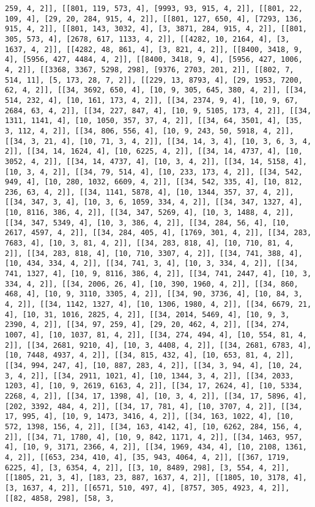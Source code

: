 \documentclass[12pt,fleqn]{article}\usepackage{../../common}
\begin{document}
\begin{verbatim}
259, 4, 2]], [[801, 119, 573, 4], [9993, 93, 915, 4, 2]], [[801, 22, 109, 4], [29, 20, 284, 915, 4, 2]], [[801, 127, 650, 4], [7293, 136, 915, 4, 2]], [[801, 143, 3032, 4], [3, 3871, 284, 915, 4, 2]], [[801, 305, 573, 4], [2678, 617, 1133, 4, 2]], [[4282, 10, 2164, 4], [3, 1637, 4, 2]], [[4282, 48, 861, 4], [3, 821, 4, 2]], [[8400, 3418, 9, 4], [5956, 427, 4484, 4, 2]], [[8400, 3418, 9, 4], [5956, 427, 1006, 4, 2]], [[3368, 3367, 5298, 298], [9376, 2703, 201, 2]], [[802, 7, 514, 11], [5, 173, 28, 7, 2]], [[229, 13, 8793, 4], [29, 1953, 7200, 62, 4, 2]], [[34, 3692, 650, 4], [10, 9, 305, 645, 380, 4, 2]], [[34, 514, 232, 4], [10, 161, 173, 4, 2]], [[34, 2374, 9, 4], [10, 9, 67, 2684, 63, 4, 2]], [[34, 227, 847, 4], [10, 9, 5105, 173, 4, 2]], [[34, 1311, 1141, 4], [10, 1050, 357, 37, 4, 2]], [[34, 64, 3501, 4], [35, 3, 112, 4, 2]], [[34, 806, 556, 4], [10, 9, 243, 50, 5918, 4, 2]], [[34, 3, 21, 4], [10, 71, 3, 4, 2]], [[34, 14, 3, 4], [10, 3, 6, 3, 4, 2]], [[34, 14, 1624, 4], [10, 6225, 4, 2]], [[34, 14, 4737, 4], [10, 3052, 4, 2]], [[34, 14, 4737, 4], [10, 3, 4, 2]], [[34, 14, 5158, 4], [10, 3, 4, 2]], [[34, 79, 514, 4], [10, 233, 173, 4, 2]], [[34, 542, 949, 4], [10, 280, 1032, 6609, 4, 2]], [[34, 542, 335, 4], [10, 812, 236, 63, 4, 2]], [[34, 1141, 5878, 4], [10, 1344, 357, 37, 4, 2]], [[34, 347, 3, 4], [10, 3, 6, 1059, 334, 4, 2]], [[34, 347, 1327, 4], [10, 8116, 386, 4, 2]], [[34, 347, 5269, 4], [10, 3, 1488, 4, 2]], [[34, 347, 5349, 4], [10, 3, 386, 4, 2]], [[34, 284, 56, 4], [10, 2617, 4597, 4, 2]], [[34, 284, 405, 4], [1769, 301, 4, 2]], [[34, 283, 7683, 4], [10, 3, 81, 4, 2]], [[34, 283, 818, 4], [10, 710, 81, 4, 2]], [[34, 283, 818, 4], [10, 710, 3307, 4, 2]], [[34, 741, 388, 4], [10, 434, 334, 4, 2]], [[34, 741, 3, 4], [10, 3, 334, 4, 2]], [[34, 741, 1327, 4], [10, 9, 8116, 386, 4, 2]], [[34, 741, 2447, 4], [10, 3, 334, 4, 2]], [[34, 2006, 26, 4], [10, 390, 1960, 4, 2]], [[34, 860, 468, 4], [10, 9, 3110, 3305, 4, 2]], [[34, 90, 3736, 4], [10, 84, 3, 4, 2]], [[34, 1142, 1327, 4], [10, 1306, 1980, 4, 2]], [[34, 6679, 21, 4], [10, 31, 1016, 2825, 4, 2]], [[34, 2014, 5469, 4], [10, 9, 3, 2390, 4, 2]], [[34, 97, 259, 4], [29, 20, 462, 4, 2]], [[34, 274, 1007, 4], [10, 1037, 81, 4, 2]], [[34, 274, 494, 4], [10, 554, 81, 4, 2]], [[34, 2681, 9210, 4], [10, 3, 4408, 4, 2]], [[34, 2681, 6783, 4], [10, 7448, 4937, 4, 2]], [[34, 815, 432, 4], [10, 653, 81, 4, 2]], [[34, 994, 247, 4], [10, 887, 283, 4, 2]], [[34, 3, 94, 4], [10, 24, 3, 4, 2]], [[34, 2911, 1021, 4], [10, 1344, 3, 4, 2]], [[34, 2033, 1203, 4], [10, 9, 2619, 6163, 4, 2]], [[34, 17, 2624, 4], [10, 5334, 2268, 4, 2]], [[34, 17, 1398, 4], [10, 3, 4, 2]], [[34, 17, 5896, 4], [202, 3392, 484, 4, 2]], [[34, 17, 781, 4], [10, 3707, 4, 2]], [[34, 17, 995, 4], [10, 9, 1473, 3416, 4, 2]], [[34, 163, 1022, 4], [10, 572, 1398, 156, 4, 2]], [[34, 163, 4142, 4], [10, 6262, 284, 156, 4, 2]], [[34, 71, 1780, 4], [10, 9, 842, 1171, 4, 2]], [[34, 1463, 957, 4], [10, 9, 3171, 2366, 4, 2]], [[34, 1969, 434, 4], [10, 2108, 1361, 4, 2]], [[653, 234, 410, 4], [35, 943, 4064, 4, 2]], [[367, 1719, 6225, 4], [3, 6354, 4, 2]], [[3, 10, 8489, 298], [3, 554, 4, 2]], [[1805, 21, 3, 4], [183, 23, 887, 1637, 4, 2]], [[1805, 10, 3178, 4], [3, 1637, 4, 2]], [[6571, 510, 497, 4], [8757, 305, 4923, 4, 2]], [[82, 4858, 298], [58, 3, 
\end{verbatim}
\end{document}
